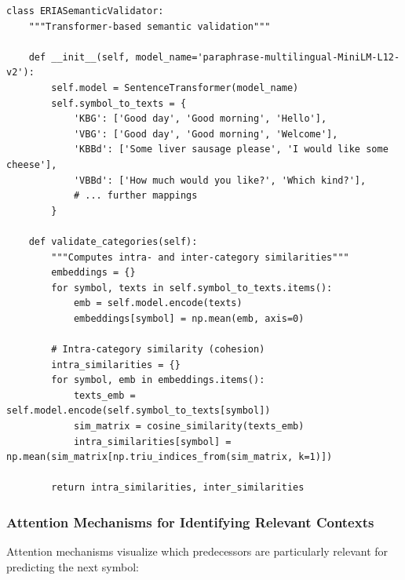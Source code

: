 \documentclass[12pt,a4paper]{article}
\begin{document}
\begin{lstlisting}[caption=Semantic validation in ERIA]
class ERIASemanticValidator:
    """Transformer-based semantic validation"""
    
    def __init__(self, model_name='paraphrase-multilingual-MiniLM-L12-v2'):
        self.model = SentenceTransformer(model_name)
        self.symbol_to_texts = {
            'KBG': ['Good day', 'Good morning', 'Hello'],
            'VBG': ['Good day', 'Good morning', 'Welcome'],
            'KBBd': ['Some liver sausage please', 'I would like some cheese'],
            'VBBd': ['How much would you like?', 'Which kind?'],
            # ... further mappings
        }
    
    def validate_categories(self):
        """Computes intra- and inter-category similarities"""
        embeddings = {}
        for symbol, texts in self.symbol_to_texts.items():
            emb = self.model.encode(texts)
            embeddings[symbol] = np.mean(emb, axis=0)
        
        # Intra-category similarity (cohesion)
        intra_similarities = {}
        for symbol, emb in embeddings.items():
            texts_emb = self.model.encode(self.symbol_to_texts[symbol])
            sim_matrix = cosine_similarity(texts_emb)
            intra_similarities[symbol] = np.mean(sim_matrix[np.triu_indices_from(sim_matrix, k=1)])
        
        return intra_similarities, inter_similarities
\end{lstlisting}

\subsubsection{Attention Mechanisms for Identifying Relevant Contexts}

Attention mechanisms visualize which predecessors are particularly relevant for predicting the next symbol:
\end{document}

